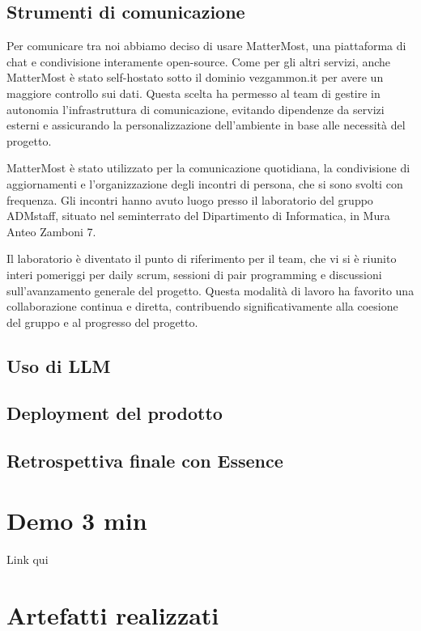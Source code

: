 \documentclass{article}
\begin{document}
\subsection{Strumenti di comunicazione}
Per comunicare tra noi abbiamo deciso di usare MatterMost, una piattaforma di chat e condivisione interamente open-source. Come per gli altri servizi, anche MatterMost 
è stato self-hostato sotto il dominio vezgammon.it per avere un maggiore controllo sui dati. Questa scelta ha permesso al team di gestire in autonomia 
l'infrastruttura di comunicazione, evitando dipendenze da servizi esterni e assicurando la personalizzazione dell'ambiente in base alle necessità del progetto. \par
MatterMost è stato utilizzato per la comunicazione quotidiana, la condivisione di aggiornamenti e l'organizzazione degli incontri di persona, che si sono svolti con frequenza. 
Gli incontri hanno avuto luogo presso il laboratorio del gruppo ADMstaff, situato nel seminterrato del Dipartimento di Informatica, in Mura Anteo Zamboni 7. \par
Il laboratorio è diventato il punto di riferimento per il team, che vi si è riunito interi pomeriggi per daily scrum, sessioni di pair programming e discussioni sull'avanzamento 
generale del progetto. Questa modalità di lavoro ha favorito una collaborazione continua e diretta, contribuendo significativamente alla coesione del gruppo e al progresso del progetto.

\subsection{Uso di LLM}

\subsection{Deployment del prodotto}

\subsection{Retrospettiva finale con Essence}

\section{Demo 3 min}
Link qui

\section{Artefatti realizzati}
\end{document}

